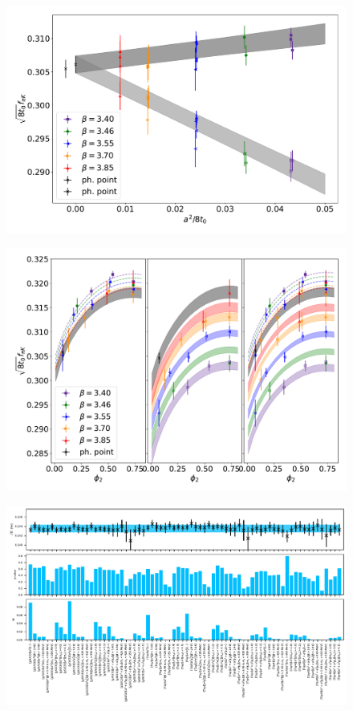 \begin{figure}
    \centering
    \includegraphics[width=1.\textwidth]{./cap5/figs/SU3a2_projection.pdf}
    \caption{}
    \label{ch_ss:fig:}
\end{figure}

\begin{figure}
    \centering
    \includegraphics[width=1.\textwidth]{./cap5/figs/SU3.pdf}
    \caption{}
    \label{ch_ss:fig:}
\end{figure}

\begin{figure}
    \centering
    \includegraphics[width=1.\textwidth]{./cap5/figs/BMA_w.pdf}
    \caption{}
    \label{ch_ss:fig:}
\end{figure}


